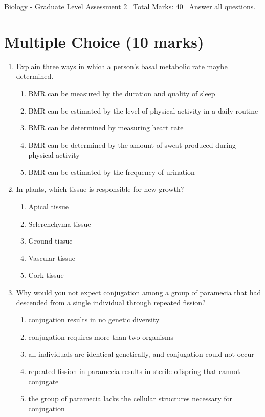 \documentclass[12pt]{article}
\begin{document}
\begin{center}
Biology - Graduate Level Assessment 2 \
Total Marks: 40 \
Answer all questions.
\end{center}

\section*{Multiple Choice (10 marks)}
\begin{enumerate}[label=\arabic*.]
\item Explain three ways in which a person's basal metabolic rate maybe determined.
\begin{enumerate}[label=(\alph*)]
    \item BMR can be measured by the duration and quality of sleep
    \item BMR can be estimated by the level of physical activity in a daily routine
    \item BMR can be determined by measuring heart rate
    \item BMR can be determined by the amount of sweat produced during physical activity
    \item BMR can be estimated by the frequency of urination
\end{enumerate}
\item In plants, which tissue is responsible for new growth?
\begin{enumerate}[label=(\alph*)]
    \item Apical tissue
    \item Sclerenchyma tissue
    \item Ground tissue
    \item Vascular tissue
    \item Cork tissue
\end{enumerate}
\item Why would you not expect conjugation among a group of paramecia that had descended from a single individual through repeated fission?
\begin{enumerate}[label=(\alph*)]
    \item conjugation results in no genetic diversity
    \item conjugation requires more than two organisms
    \item all individuals are identical genetically, and conjugation could not occur
    \item repeated fission in paramecia results in sterile offspring that cannot conjugate
    \item the group of paramecia lacks the cellular structures necessary for conjugation

\end{enumerate}
\end{enumerate}
\end{document}

